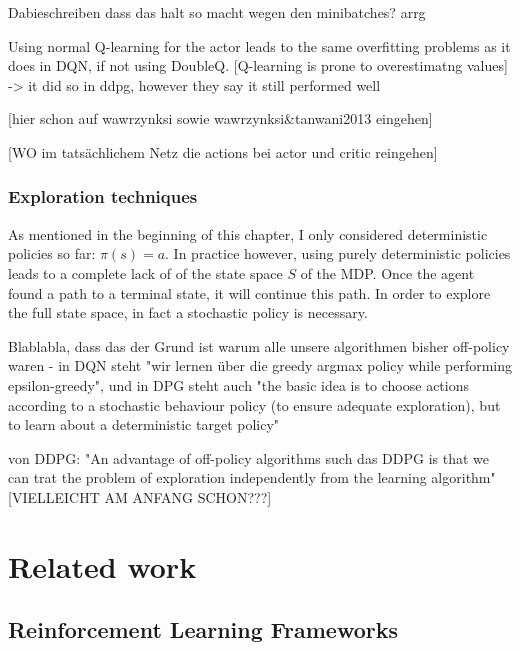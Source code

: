 Dabieschreiben dass das halt so macht wegen den minibatches? arrg

Using normal Q-learning for the actor leads to the same overfitting problems as it does in DQN, if not using DoubleQ. [Q-learning is prone to overestimatng values] -> it did so in ddpg, however they say it still performed well

[hier schon auf wawrzynksi sowie wawrzynksi\&tanwani2013 eingehen]

[WO im tatsächlichem Netz die actions bei actor und critic reingehen]

\subsection{Exploration techniques}

As mentioned in the beginning of this chapter, I only considered deterministic policies so far: $\pi(s) = a$. In practice however, using purely deterministic policies leads to a complete lack of  of the state space $S$ of the MDP. Once the agent found a path to a terminal state, it will continue  this path. In order to explore the full state space, in fact a stochastic policy is necessary.

Blablabla, dass das der Grund ist warum alle unsere algorithmen bisher off-policy waren - in DQN steht "wir lernen über die greedy argmax policy while performing epsilon-greedy", und in DPG steht auch "the basic idea is to choose actions according to a stochastic behaviour policy (to ensure adequate exploration), but to learn about a deterministic target policy"

von DDPG: "An advantage of off-policy algorithms such das DDPG is that we can trat the problem of exploration independently from the learning algorithm" [VIELLEICHT AM ANFANG SCHON???]



\chapter{Related work}

\section{Reinforcement Learning Frameworks}

